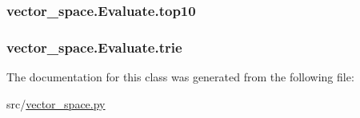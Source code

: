 \subsubsection[{\texorpdfstring{top10}{top10}}]{\setlength{\rightskip}{0pt plus 5cm}vector\+\_\+space.\+Evaluate.\+top10}\hypertarget{classvector__space_1_1_evaluate_a8e95a5f443892a2d8887f8ebc90476e3}{}\label{classvector__space_1_1_evaluate_a8e95a5f443892a2d8887f8ebc90476e3}
\subsubsection[{\texorpdfstring{trie}{trie}}]{\setlength{\rightskip}{0pt plus 5cm}vector\+\_\+space.\+Evaluate.\+trie}\hypertarget{classvector__space_1_1_evaluate_a39fea1c78318d69c46a8aa6a402833bb}{}\label{classvector__space_1_1_evaluate_a39fea1c78318d69c46a8aa6a402833bb}


The documentation for this class was generated from the following file\+:\begin{DoxyCompactItemize}
\item 
src/\hyperlink{vector__space_8py}{vector\+\_\+space.\+py}\end{DoxyCompactItemize}
